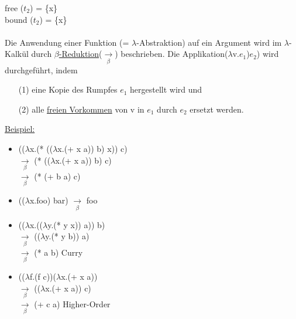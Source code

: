\documentclass[a4paper,12pt]{article}
\begin{document}
free ($t_2$) = \{x\}\\
bound ($t_2$) = \{x\}\\
\\
Die Anwendung einer Funktion (= $\lambda$-Abstraktion) auf ein Argument wird im $\lambda$-Kalkül durch \uline{$\beta$-Reduktion}($\underset{\beta}{\rightarrow}$) beschrieben. Die Applikation($\lambda$v.$e_1$)$e_2$) wird durchgeführt, indem
\begin{itemize}
\item[(1)] eine Kopie des Rumpfes $e_1$ hergestellt wird und
\item[(2)] alle \uline{freien Vorkommen} von v in $e_1$ durch $e_2$ ersetzt werden.
\end{itemize} 
\uline{Beispiel:}
\begin{itemize}
\item 
(($\lambda$x.(* (($\lambda$x.(+ x a)) b) x)) c)\\
$\underset{\beta}{\rightarrow}$ (* (($\lambda$x.(+ x a)) b) c)\\
$\underset{\beta}{\rightarrow}$ (* (+ b a) c)
\item
(($\lambda$x.foo) bar) $\underset{\beta}{\rightarrow}$ foo
\item 
(($\lambda$x.(($\lambda$y.(* y x)) a)) b)\\
$\underset{\beta}{\rightarrow}$ (($\lambda$y.(* y b)) a)\\
$\underset{\beta}{\rightarrow}$ (* a b) Curry
\item
(($\lambda$f.(f c))($\lambda$x.(+ x a))\\
$\underset{\beta}{\rightarrow}$ (($\lambda$x.(+ x a)) c)\\
$\underset{\beta}{\rightarrow}$ (+ c a) Higher-Order
\end{itemize}
\end{document}
